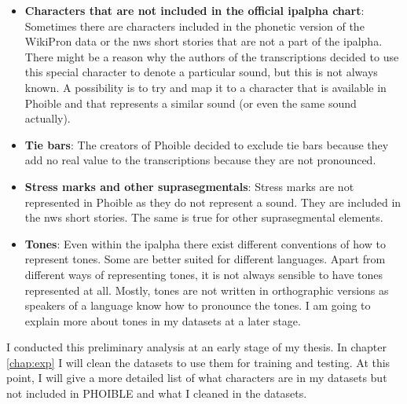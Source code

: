 \begin{itemize}
\item \textbf{Characters that are not included in the official \ac{ipalpha} chart}: Sometimes there are characters included in the phonetic version of the WikiPron data or the \ac{nws} short stories that are not a part of the \ac{ipalpha}. There might be a reason why the authors of the transcriptions decided to use this special character to denote a particular sound, but this is not always known. A possibility is to try and map it to a character that is available in Phoible and that represents a similar sound (or even the same sound actually). 
\item \textbf{Tie bars}: The creators of Phoible decided to exclude tie bars because they add no real value to the transcriptions because they are not pronounced.
\item \textbf{Stress marks and other suprasegmentals}: Stress marks are not represented in Phoible as they do not represent a sound. They are included in the \ac{nws} short stories. The same is true for other suprasegmental elements.
\item \textbf{Tones}: Even within the \ac{ipalpha} there exist different conventions of how to represent tones. Some are better suited for different languages. Apart from different ways of representing tones, it is not always sensible to have tones represented at all. Mostly, tones are not written in orthographic versions as speakers of a language know how to pronounce the tones. I am going to explain more about tones in my datasets at a later stage.
\end{itemize}

I conducted this preliminary analysis at an early stage of my thesis. In chapter \ref{chap:exp} I will clean the datasets to use them for training and testing. At this point, I will give a more detailed list of what characters are in my datasets but not included in PHOIBLE and what I cleaned in the datasets.







